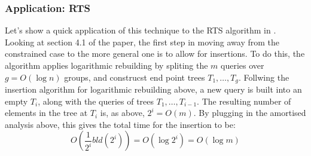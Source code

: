 \documentclass{article}
\begin{document}
\subsubsection*{Application: RTS}
Let's show a quick application of this technique to the RTS algorithm in \cite{Gan2016}. Looking at section 4.1 of the paper, the first step in moving away from the constrained case to the more general one is to allow for insertions. To do this, the algorithm applies logarithmic rebuilding by spliting the $m$ queries over $g = O(\log n)$ groups, and construcst end point trees $T_1, \dots, T_g$. Follwing the insertion algorithm for logarithmic rebuilding above, a new query is built into an empty $T_i$, along with the queries of trees $T_1, \dots, T_{i-1}$. The resulting number of elements in the tree at $T_i$ is, as above, $2^i = O(m)$. By plugging in the amortised analysis above, this gives the total time for the insertion to be: 
$$O(\frac{1}{2^i}bld(2^i)) = O(\log 2^i) = O(\log m)$$



\newpage

\end{document}
